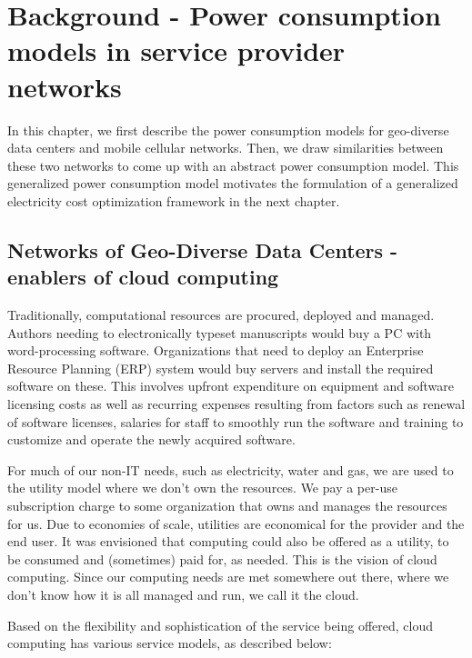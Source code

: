 \chapter{Background - Power consumption models in service provider networks}
\label{chap:background}
In this chapter, we first describe the power consumption models for geo-diverse data centers and mobile cellular networks. Then, we draw similarities between these two networks to come up with an abstract power consumption model. This generalized power consumption model motivates the formulation of a generalized electricity cost optimization framework in the next chapter. 

\section{Networks of Geo-Diverse Data Centers - enablers of cloud computing} Traditionally, computational resources are procured, deployed and managed. Authors needing to electronically typeset manuscripts would buy a PC with word-processing software. Organizations that need to deploy an Enterprise Resource Planning (ERP) system would buy servers and install the required software on these. This involves upfront expenditure on equipment and software licensing costs as well as recurring expenses resulting from factors such as renewal of software licenses, salaries for staff to smoothly run the software and training to customize and operate the newly acquired software. 

For much of our non-IT needs, such as electricity, water and gas, we are used to the utility model where we don't own the resources. We pay a per-use subscription charge to some organization that owns and manages the resources for us. Due to economies of scale, utilities are economical for the provider and the end user. It was envisioned that computing could also be offered as a utility, to be consumed and (sometimes) paid for, as needed. This is the vision of cloud computing. Since our computing needs are met somewhere out there, where we don't know how it is all managed and run, we call it the cloud.

Based on the flexibility and sophistication of the service being offered, cloud computing has various service models, as described below: 

